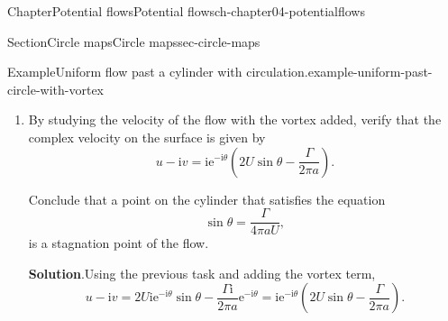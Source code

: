 \documentclass[oneside,10pt,]{book}
\newcommand{\blocktitlefont}{\relax}
\numberwithin{equation}{section}
\newcommand{\e}{\mathrm{e}}
\newcommand{\im}{\mathrm{i}}
\begin{document}
\begin{chapterptx}{Chapter}{Potential flows}{}{Potential flows}{}{}{ch-chapter04-potentialflows}
\begin{sectionptx}{Section}{Circle maps}{}{Circle maps}{}{}{sec-circle-maps}
\begin{example}{Example}{Uniform flow past a cylinder with circulation.}{example-uniform-past-circle-with-vortex}
\begin{enumerate}[font=\bfseries,label=(\alph*),ref=\alph*]
\begin{equation*}
w(z) = U \left(z + \frac{a^2}{z}\right) - \frac{\im\Gamma}{2\pi} \log z.
\end{equation*}
Verify again that the above modification does not change the streamline properties of \(|z| = a\).%
\par
Does the above flow satisfy the condition that the flow is of uniform speed \(U\) far upstream?%
\par\smallskip%
\noindent\textbf{\blocktitlefont Solution}.\hypertarget{example-uniform-past-circle-with-vortex-7-2}{}\quad{}The streamfunction of the vortex is constant on circles centred at the origin, so the cylinder remains a streamline. Indeed, on the surface, the added term is%
\begin{equation*}
-\frac{\im \Gamma}{2\pi} (\log a + \im \theta) = \frac{\Gamma\theta}{2\pi} - \frac{\im\Gamma}{2\pi}\log a.
\end{equation*}
Therefore the imaginary part is still a constant, and hence the boundary of the cylinder is still a streamline of the flow.%
\par
To verify that the upstream flow is not altered, we take a derivative to obtain the complex velocity:%
\begin{equation*}
w'(z) = u - \im v = U\left(1 - \frac{a^2}{z^2}\right) - \frac{\im\Gamma}{2\pi z}.
\end{equation*}
So in the limit \(|z| \to \infty\), the velocity is horizontal with speed \(U\).%
\item{}By studying the velocity of the flow with the vortex added, verify that the complex velocity on the surface is given by%
\begin{equation*}
u - \im v = \im \e^{-\im\theta}\left(2U \sin\theta  - \frac{\Gamma}{2\pi a}\right). 
\end{equation*}
%
\par
Conclude that a point on the cylinder that satisfies the equation%
\begin{equation*}
\sin\theta = \frac{\Gamma}{4\pi a U},
\end{equation*}
is a stagnation point of the flow.%
\par\smallskip%
\noindent\textbf{\blocktitlefont Solution}.\hypertarget{example-uniform-past-circle-with-vortex-8-2}{}\quad{}Using the previous task and adding the vortex term,%
\begin{equation*}
u - \im v = 2U \im \e^{-\im\theta}\sin\theta - \frac{\Gamma\im}{2\pi a} \e^{-\im\theta} = \im \e^{-\im\theta}
\left(2U \sin\theta - \frac{\Gamma}{2\pi a}\right).

\end{equation*}
\end{enumerate}
\end{example}
\end{sectionptx}
\end{chapterptx}
\end{document}
